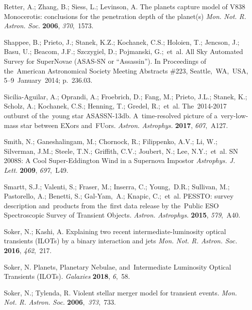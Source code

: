 \documentclass[galaxies,article,accept,moreauthors,pdftex]{mdpi}
\makeatletter
\let\jnl@style=\rmfamily
\def\ref@jnl#1{{\jnl@style#1}}%
\newcommand\apjl{\ref@jnl{Astrophys. J. Lett.}}     %
\newcommand\aap{\ref@jnl{Astron. Astrophys.}}%
\newcommand\mnras{\ref@jnl{Mon. Not. R. Astron. Soc.}}%
\makeatother
\begin{document}
\begin{thebibliography}{999}
 Retter, A.; Zhang, B.; Siess, L.; Levinson, A. The planets capture model of V838 Monocerotis: conclusions for the penetration depth of the planet(s) {\em \mnras} \textbf{2006}, \emph{370},~1573.

 Shappee, B.; Prieto, J.; Stanek, K.Z.; Kochanek, C.S.; Holoien, T.; Jencson, J.; Basu, U.; Beacom, J.F.; Szczygiel, D.; Pojmanski, G.;~et~al. All Sky Automated Survey for SuperNovae (ASAS-SN or ``Assassin''). In Proceedings of the~American Astronomical Society Meeting Abstracts \#223, Seattle,~WA,~USA,  5--9~January~2014; p.~236.03. 


 Sicilia-Aguilar, A.; Oprandi, A.; Froebrich, D.; Fang, M.; Prieto, J.L.; Stanek, K.; Scholz, A.; Kochanek, C.S.; Henning, T.; Gredel, R.;~et~al. The~2014-2017 outburst of the~young star ASASSN-13db. A~time-resolved picture of a~very-low-mass star between EXors and~FUors. {\em \aap}  \textbf{2017}, \emph{607},~A127.


 Smith, N.; Ganeshalingam, M.; Chornock, R.; Filippenko, A.V.; Li, W.; Silverman, J.M.; Steele, T.N.; Griffith, C.V.; Joubert, N.; Lee, N.Y.;~et~al. SN 2008S: A Cool Super-Eddington Wind in a Supernova Impostor  {\em \apjl} \textbf{2009}, \emph{697},~L49.


 Smartt, S.J.; Valenti, S.; Fraser, M.; Inserra, C.; Young,~D.R.; Sullivan, M.; Pastorello, A.; Benetti, S.; Gal-Yam,~A.; Knapic, C.;~et~al. PESSTO: survey description and~products from the~first data release by the~Public ESO Spectroscopic Survey of Transient Objects. {\em \aap} \textbf{2015}, \emph{579},~A40.



 Soker, N.; Kashi, A. Explaining two recent intermediate-luminosity optical transients (ILOTs) by a binary interaction and jets  {\em \mnras} \textbf{2016}, \emph{462},~217.


 Soker, N. Planets, Planetary Nebulae, and~Intermediate Luminosity Optical Transients (ILOTs).  {\em Galaxies} \textbf{2018}, \emph{6},~58.



 Soker, N.; Tylenda, R. Violent stellar merger model for transient events. {\em \mnras} \textbf{2006},~\emph{373},~733.




\end{thebibliography}
\end{document}

